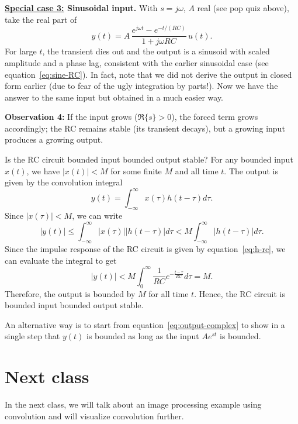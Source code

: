 \documentclass{ee102_notes}
\begin{document}
\textbf{\ul{Special case 3:} Sinusoidal input.} With $s=j\omega$, $A$ real (see pop quiz above), take the real part of
    \[
    y(t)=A\,\frac{e^{j\omega t}-e^{-t/(RC)}}{1+j\omega RC}\,u(t).
    \]
For large $t$, the transient dies out and the output is a sinusoid with scaled amplitude and a phase lag, consistent with the earlier sinusoidal case (see equation~\eqref{eq:sine-RC}). In fact, note that we did not derive the output in closed form earlier (due to fear of the ugly integration by parts!). Now we have the answer to the same input but obtained in a much easier way. 

\textbf{Observation 4:} If the input grows ($\Re\{s\}>0$), the forced term grows accordingly; the RC remains stable (its transient decays), but a growing input produces a growing output.
\begin{popquiz}
    Is the RC circuit bounded input bounded output stable? 
    \popqsplit 
    For any bounded input $x(t)$, we have $|x(t)| < M$ for some finite $M$ and all time $t$. The output is given by the convolution integral
    \[
    y(t) = \int_{-\infty}^{\infty} x(\tau) h(t - \tau) d\tau.
    \]
    Since $|x(\tau)| < M$, we can write
    \[
    |y(t)| \leq \int_{-\infty}^{\infty} |x(\tau)| |h(t - \tau)| d\tau < M \int_{-\infty}^{\infty} |h(t - \tau)| d\tau.
    \]
    Since the impulse response of the RC circuit is given by equation~\eqref{eq:h-rc}, we can evaluate the integral to get
    \[
    |y(t)| < M \int_{0}^{\infty} \frac{1}{RC} e^{-\frac{t - \tau}{RC}} d\tau = M.
    \]
    Therefore, the output is bounded by $M$ for all time $t$. Hence, the RC circuit is bounded input bounded output stable.

    An alternative way is to start from equation~\eqref{eq:output-complex} to show in a single step that $y(t)$ is bounded as long as the input $Ae^{st}$ is bounded. 
\end{popquiz}

\section{Next class}
In the next class, we will talk about an image processing example using convolution and will visualize convolution further. 
\end{document}

